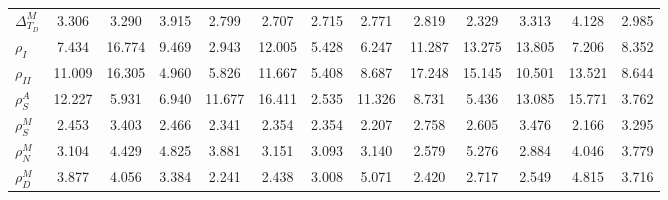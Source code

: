 \begin{center}
\begin{longtable}{lcccccccccccc}
$ {\Delta^{M}_{T_D}}   $	 & 	       3.306	 & 	       3.290	 & 	       3.915	 & 	       2.799	 & 	       2.707	 & 	       2.715	 & 	       2.771	 & 	       2.819	 & 	       2.329	 & 	       3.313	 & 	       4.128	 & 	       2.985 \\ 
$ {\rho_{I}}           $	 & 	       7.434	 & 	      16.774	 & 	       9.469	 & 	       2.943	 & 	      12.005	 & 	       5.428	 & 	       6.247	 & 	      11.287	 & 	      13.275	 & 	      13.805	 & 	       7.206	 & 	       8.352 \\ 
$ {\rho_{II}}          $	 & 	      11.009	 & 	      16.305	 & 	       4.960	 & 	       5.826	 & 	      11.667	 & 	       5.408	 & 	       8.687	 & 	      17.248	 & 	      15.145	 & 	      10.501	 & 	      13.521	 & 	       8.644 \\ 
$ {\rho^{A}_{S}}       $	 & 	      12.227	 & 	       5.931	 & 	       6.940	 & 	      11.677	 & 	      16.411	 & 	       2.535	 & 	      11.326	 & 	       8.731	 & 	       5.436	 & 	      13.085	 & 	      15.771	 & 	       3.762 \\ 
$ {\rho^{M}_{S}}       $	 & 	       2.453	 & 	       3.403	 & 	       2.466	 & 	       2.341	 & 	       2.354	 & 	       2.354	 & 	       2.207	 & 	       2.758	 & 	       2.605	 & 	       3.476	 & 	       2.166	 & 	       3.295 \\ 
$ {\rho^{M}_{N}}       $	 & 	       3.104	 & 	       4.429	 & 	       4.825	 & 	       3.881	 & 	       3.151	 & 	       3.093	 & 	       3.140	 & 	       2.579	 & 	       5.276	 & 	       2.884	 & 	       4.046	 & 	       3.779 \\ 
$ {\rho^{M}_{D}}       $	 & 	       3.877	 & 	       4.056	 & 	       3.384	 & 	       2.241	 & 	       2.438	 & 	       3.008	 & 	       5.071	 & 	       2.420	 & 	       2.717	 & 	       2.549	 & 	       4.815	 & 	       3.716 \\ 
\end{longtable}
 \end{center}
